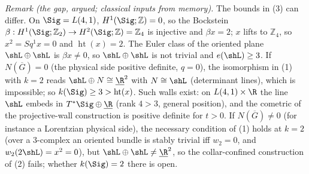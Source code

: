 \emph{Remark (the gap, argued; classical inputs from memory).} The bounds in (3) can differ. On $\Sig = L(4,1)$, $H^1(\Sig;\mathbb{Z}) = 0$, so the Bockstein $\beta : H^1(\Sig;\mathbb{Z}_2) \to H^2(\Sig;\mathbb{Z}) = \mathbb{Z}_4$ is injective and $\beta x = 2$; $x$ lifts to $\mathbb{Z}_4$, so $x^{2} = Sq^{1}x = 0$ and $\operatorname{ht}(x) = 2$. The Euler class of the oriented plane $\shL \oplus \shL$ is $\beta x \neq 0$, so $\shL \oplus \shL$ is not trivial and $e(\shL) \geq 3$. If $N(\overline G) = 0$ (the physical side positive definite, $q = 0$), the isomorphism in (1) with $k = 2$ reads $\shL \oplus N \cong \underline{\R}^{2}$ with $N \cong \shL$ (determinant lines), which is impossible; so $k(\Sig) \geq 3 > \operatorname{ht}(x)$. Such walls exist: on $L(4,1) \times \R$ the line $\shL$ embeds in $T^*\Sig \oplus \underline{\R}$ (rank $4 > 3$, general position), and the cometric of the projective-wall construction is positive definite for $t > 0$. If $N(\overline G) \neq 0$ (for instance a Lorentzian physical side), the necessary condition of (1) holds at $k = 2$ (over a $3$-complex an oriented bundle is stably trivial iff $w_2 = 0$, and $w_2(2\shL) = x^{2} = 0$), but $\shL \oplus \shL \neq \underline{\R}^{2}$, so the collar-confined construction of (2) fails; whether $k(\Sig) = 2$ there is open.
